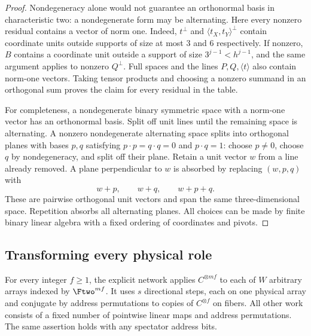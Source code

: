 \begin{proof}
Nondegeneracy alone would not guarantee an orthonormal basis in
characteristic two: a nondegenerate form may be alternating.  Here
every nonzero residual contains a vector of norm one.  Indeed,
$t^\perp$ and $\langle t_X,t_Y\rangle^\perp$ contain coordinate
units outside supports of size at most $3$ and $6$ respectively.
If nonzero, $B$ contains a coordinate unit outside a support of
size $3^{j-1}<h^{j-1}$, and the same argument applies to nonzero
$Q^\perp$.  Full spaces and the lines $P,Q,\langle t\rangle$
also contain norm-one vectors.  Taking tensor products and choosing
a nonzero summand in an orthogonal sum proves the claim for every
residual in the table.

For completeness, a nondegenerate binary symmetric space with a
norm-one vector has an orthonormal basis.  Split off unit lines
until the remaining space is alternating.  A nonzero nondegenerate
alternating space splits into orthogonal planes with bases $p,q$
satisfying $p\cdot p=q\cdot q=0$ and $p\cdot q=1$: choose $p\ne0$,
choose $q$ by nondegeneracy, and split off their plane.  Retain a
unit vector $w$ from a line already removed.  A plane perpendicular
to $w$ is absorbed by replacing $(w,p,q)$ with
\[
 w+p,\qquad w+q,\qquad w+p+q.
\]
These are pairwise orthogonal unit vectors and span the same
three-dimensional space.  Repetition absorbs all alternating
planes.  All choices can be made by finite binary linear algebra
with a fixed ordering of coordinates and pivots.
\end{proof}

\subsection{Transforming every physical role}

\begin{proposition}\label{net:finite-interface}
For every integer $f\ge1$, the explicit network applies
$C^{\otimes mf}$ to each of $W$ arbitrary arrays indexed by
$\Ftwo^{mf}$.  It uses $s$ directional steps, each on one physical
array and conjugate by address permutations to copies of
$C^{\otimes f}$ on fibers.  All other work consists of a fixed
number of pointwise linear maps and address permutations.  The
same assertion holds with any spectator address bits.
\end{proposition}

